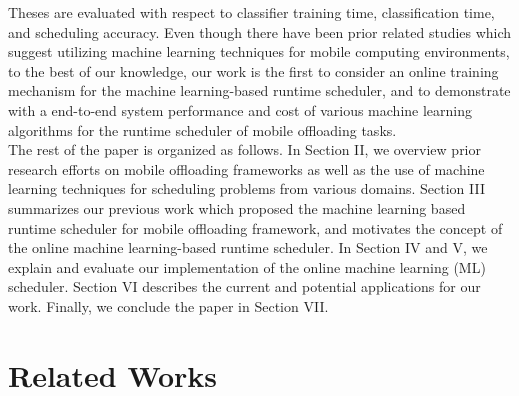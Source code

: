 \documentclass[10pt, conference, compsocconf]{IEEEtran}
\begin{document}
%
Theses are evaluated with respect to classifier training time,
classification time, and scheduling accuracy.
%
Even though there have been prior related studies which suggest
utilizing machine learning techniques for mobile computing environments,
to the best of our knowledge, our work is the first to consider an
online training mechanism for the machine learning-based runtime
scheduler, and to demonstrate with a end-to-end system performance and
cost of various machine learning algorithms for the runtime scheduler of
mobile offloading tasks.\\
%
\indent The rest of the paper is organized as follows.
%
In Section II, we overview prior research efforts on 
mobile offloading frameworks as well as the use of machine
learning techniques for scheduling problems from various domains.
%
Section III summarizes our previous work which proposed the machine
learning based runtime scheduler for mobile offloading framework, and 
motivates the concept of the online machine learning-based
runtime scheduler.
%
In Section IV and V, we explain and evaluate our implementation of the
online machine learning (ML) scheduler.
%
Section VI describes the current and potential applications for
our work.
%
Finally, we conclude the paper in Section VII.
%
\section{Related Works}
%
\end{document}
